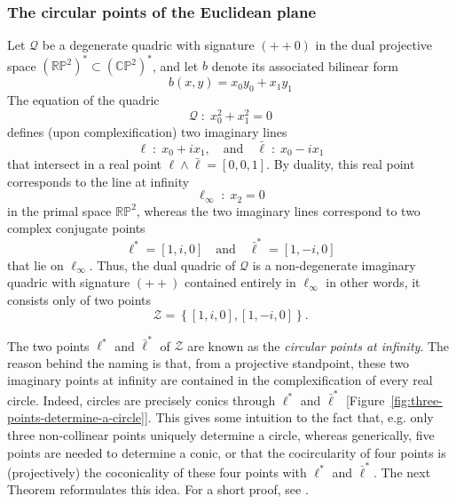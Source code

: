 \documentclass[10pt, a4paper]{article}
\theoremstyle{BoldTopSpacing}
\theoremstyle{BoldTopSpacing}
\theoremstyle{BoldTopSpacing}
\theoremstyle{BoldTopBottomSpacing}
\theoremstyle{BoldTopSpacing}
\theoremstyle{BoldTopBottomSpacing}
\theoremstyle{remark}
\begin{document}
\subsubsection{The circular points of the Euclidean plane}
\label{subsubsec:circular-points-two-dimensional}

Let $\mathcal{Q}$ be a degenerate quadric with signature $(+ + 0)$ in the dual projective space $(\mathbb{R}\mathbb{P}^{2})^{*} \subset (\mathbb{C}\mathbb{P}^{2})^{*}$, and let $b$ denote its associated bilinear form
\[
    b(x, y) = x_{0}y_{0} + x_{1}y_{1}
\]
The equation of the quadric
\begin{equation*}
    \mathcal{Q} \; : \; x_{0}^2 + x_{1}^2 = 0
\end{equation*}
defines (upon complexification) two imaginary lines
\[
    \ell \; : \; x_{0} + i x_{1}, \quad \text{and} \quad \bar{\ell} \; : \; x_{0} - i x_{1}
\]
that intersect in a real point $\ell \wedge \bar{\ell} = [0, 0, 1]$. By duality, this real point corresponds to the line at infinity
\[
    \ell_{\infty} \; : \; x_{2} = 0
\]
in the primal space $\mathbb{R}\mathbb{P}^2$, whereas the two imaginary lines correspond to two complex conjugate points
\[
    \ell^{*} = [1, i, 0] \quad \text{and} \quad \bar{\ell}^{*} = [1, -i, 0]
\]
that lie on $\ell_{\infty}$. Thus, the dual quadric of $\mathcal{Q}$ is a non-degenerate imaginary quadric with signature $(+ +)$ contained entirely in $\ell_{\infty}$ \textemdash in other words, it consists only of two points
\begin{equation*}
    \mathcal{Z} = \left\{ [1, i, 0], [1, -i, 0] \right\}.
\end{equation*}

The two points $\ell^{*}$ and $\bar{\ell}^{*}$ of $\mathcal{Z}$ are known as the \textit{circular points at infinity}. The reason behind the naming is that, from a projective standpoint, these two imaginary points at infinity are contained in the complexification of every real circle. Indeed, circles are precisely conics through $\ell^{*}$ and $\bar{\ell}^{*}$ [Figure~\ref{fig:three-points-determine-a-circle}]. This gives some intuition to the fact that, e.g. only three non-collinear points uniquely determine a circle, whereas generically, five points are needed to determine a conic, or that the cocircularity of four points is (projectively) the coconicality of these four points with $\ell^{*}$ and $\bar{\ell}^{*}$. The next Theorem reformulates this idea. For a short proof, see \cite[\textcolor{CitationColor}{Proposition~9.9.}]{geometryII}. \par
\end{document}
